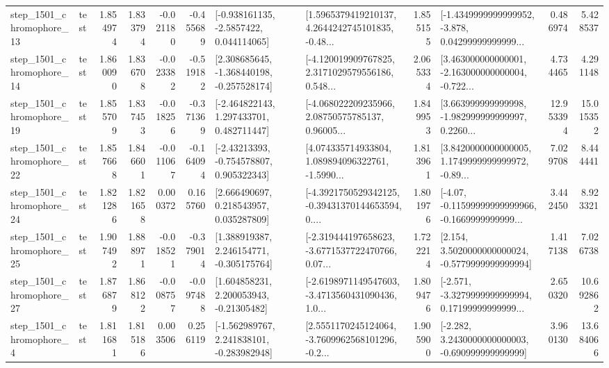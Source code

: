\begin{tabular}{llrrrrllrlrr}
 step\_1501\_chromophore\_13 &      test &      1.854974 &    1.833794 &     -0.021180 & -0.455689 &     [-0.938161135, -2.5857422, 0.044114065] &  [1.5965379419210137, 4.2644242745101835, -0.48... &       1.855155 &  [-1.4349999999999952, -3.878, 0.04299999999999... &            0.486974 &          5.428537 \\
 step\_1501\_chromophore\_14 &      test &      1.860090 &    1.836708 &     -0.023382 & -0.519182 &   [2.308685645, -1.368440198, -0.257528174] &  [-4.120019909767825, 2.3171029579556186, 0.548... &       2.065334 &  [3.463000000000001, -2.163000000000004, -0.722... &            4.734465 &          4.291148 \\
 step\_1501\_chromophore\_19 &      test &      1.855709 &    1.837453 &     -0.018256 & -0.371369 &    [-2.464822143, 1.297433701, 0.482711447] &  [-4.068022209235966, 2.08750575785137, 0.96005... &       1.849953 &  [3.663999999999998, -1.982999999999997, 0.2260... &           12.953394 &         15.015352 \\
 step\_1501\_chromophore\_22 &      test &      1.857668 &    1.846601 &     -0.011067 & -0.164094 &    [-2.43213393, -0.754578807, 0.905322343] &  [4.074335714933804, 1.089894096322761, -1.5990... &       1.813961 &  [3.8420000000000005, 1.1749999999999972, -0.89... &            7.029708 &          8.444441 \\
 step\_1501\_chromophore\_24 &      test &      1.821286 &    1.821658 &      0.000372 &  0.165760 &     [2.666490697, 0.218543957, 0.035287809] &  [-4.3921750529342125, -0.39431370144653594, 0.... &       1.801976 &  [-4.07, -0.11599999999999966, -0.1669999999999... &            3.442450 &          8.923321 \\
 step\_1501\_chromophore\_25 &      test &      1.907492 &    1.888971 &     -0.018521 & -0.379014 &    [1.388919387, 2.246154771, -0.305175764] &  [-2.319444197658623, -3.6771537722470766, 0.07... &       1.722214 &   [2.154, 3.5020000000000024, -0.5779999999999994] &            1.417138 &          7.026738 \\
 step\_1501\_chromophore\_27 &      test &      1.876879 &    1.868122 &     -0.008757 & -0.097488 &     [1.604858231, 2.200053943, -0.21305482] &  [-2.6198971149547603, -3.4713560431090436, 1.0... &       1.809476 &  [-2.571, -3.3279999999999994, 0.17199999999999... &            2.650320 &         10.692862 \\
  step\_1501\_chromophore\_4 &      test &      1.811681 &    1.815186 &      0.003506 &  0.256119 &   [-1.562989767, 2.241838101, -0.283982948] &  [2.5551170245124064, -3.7609962568101296, -0.2... &       1.905900 &   [-2.282, 3.2430000000000003, -0.690999999999999] &            3.960130 &         13.684066 \\

\end{tabular}
